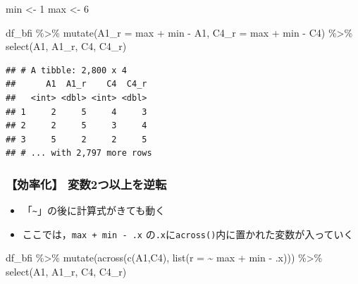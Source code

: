 \documentclass[
  xelatex,ja=standard, b5paper]{bxjsbook}
\newenvironment{Shaded}{\begin{snugshade}}{\end{snugshade}}
\newcommand{\AttributeTok}[1]{\textcolor[rgb]{0.77,0.63,0.00}{#1}}
\newcommand{\DecValTok}[1]{\textcolor[rgb]{0.00,0.00,0.81}{#1}}
\newcommand{\FunctionTok}[1]{\textcolor[rgb]{0.00,0.00,0.00}{#1}}
\newcommand{\NormalTok}[1]{#1}
\newcommand{\OtherTok}[1]{\textcolor[rgb]{0.56,0.35,0.01}{#1}}
\newcommand{\SpecialCharTok}[1]{\textcolor[rgb]{0.00,0.00,0.00}{#1}}
\providecommand{\tightlist}{%
  \setlength{\itemsep}{0pt}\setlength{\parskip}{0pt}}
\begin{document}
\begin{Shaded}
\begin{Highlighting}[]
\NormalTok{min }\OtherTok{\textless{}{-}} \DecValTok{1}
\NormalTok{max }\OtherTok{\textless{}{-}} \DecValTok{6}

\NormalTok{df\_bfi }\SpecialCharTok{\%\textgreater{}\%} 
  \FunctionTok{mutate}\NormalTok{(}\AttributeTok{A1\_r =}\NormalTok{ max }\SpecialCharTok{+}\NormalTok{ min }\SpecialCharTok{{-}}\NormalTok{ A1,}
         \AttributeTok{C4\_r =}\NormalTok{ max }\SpecialCharTok{+}\NormalTok{ min }\SpecialCharTok{{-}}\NormalTok{ C4) }\SpecialCharTok{\%\textgreater{}\%} 
  \FunctionTok{select}\NormalTok{(A1, A1\_r, C4, C4\_r)}
\end{Highlighting}
\end{Shaded}

\begin{verbatim}
## # A tibble: 2,800 x 4
##      A1  A1_r    C4  C4_r
##   <int> <dbl> <int> <dbl>
## 1     2     5     4     3
## 2     2     5     3     4
## 3     5     2     2     5
## # ... with 2,797 more rows
\end{verbatim}

\hypertarget{mu-rev-rule1}{%
\subsubsection{【効率化】 変数2つ以上を逆転}\label{mu-rev-rule1}}

\begin{itemize}
\tightlist
\item
  「\texttt{\textasciitilde{}}」の後に計算式がきても動く
\item
  ここでは，\texttt{max\ +\ min\ -\ .x} の\texttt{.x}に\texttt{across()}内に置かれた変数が入っていく
\end{itemize}

\begin{Shaded}
\begin{Highlighting}[]
\NormalTok{df\_bfi }\SpecialCharTok{\%\textgreater{}\%} 
  \FunctionTok{mutate}\NormalTok{(}\FunctionTok{across}\NormalTok{(}\FunctionTok{c}\NormalTok{(A1,C4),}
                \FunctionTok{list}\NormalTok{(}\AttributeTok{r =} \SpecialCharTok{\textasciitilde{}}\NormalTok{ max }\SpecialCharTok{+}\NormalTok{ min }\SpecialCharTok{{-}}\NormalTok{ .x))) }\SpecialCharTok{\%\textgreater{}\%} 
  \FunctionTok{select}\NormalTok{(A1, A1\_r, C4, C4\_r)}
\end{Highlighting}
\end{Shaded}
\end{document}
